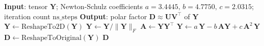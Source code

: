 \begin{algorithm}[H]
\algnarrow
\caption{MuonLMO}
\label{alg:muon_lmo}
\begin{algorithmic}[1]
\Statex \textbf{Input}: tensor $\mathbf{Y}$; Newton-Schulz coefficients $a=3.4445,\,b=4.7750,\,c=2.0315$; iteration count $\mathrm{ns\_steps}$
\Statex \textbf{Output}: polar factor $\mathbf{D}\approx\mathbf{U}\mathbf{V}^\top$ of $\mathbf{Y}$
\State $\mathbf{Y} \gets \text{ReshapeTo2D}(\mathbf{Y})$
\State $\mathbf{Y} \gets \mathbf{Y}/\|\mathbf{Y}\|_F$
    \State $\mathbf{A} \gets \mathbf{Y}\mathbf{Y}^\top$
    \State $\mathbf{Y} \gets a\,\mathbf{Y} - b\,\mathbf{A}\mathbf{Y} + c\,\mathbf{A}^2\,\mathbf{Y}$
\EndFor
\State $\mathbf{D} \gets \text{ReshapeToOriginal}(\mathbf{Y})$
\State \Return $\mathbf{D}$
\end{algorithmic}
\end{algorithm}


